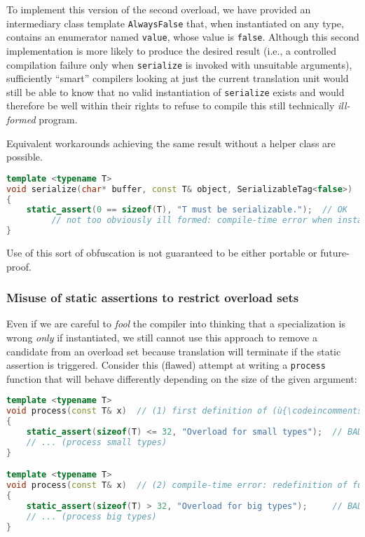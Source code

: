 \noindent To implement this version of the second overload, we have provided an
intermediary class template \lstinline!AlwaysFalse! that, when instantiated
on any type, contains an enumerator named \lstinline!value!, whose value is
\lstinline!false!. Although this second implementation is more likely to
produce the desired result (i.e., a controlled compilation failure
only when \lstinline!serialize! is invoked with unsuitable arguments),
sufficiently ``smart'' compilers looking at just the current translation
unit would still be able to know that no valid instantiation of
\lstinline!serialize! exists and would therefore be well within their
rights to refuse to compile this still technically \emph{ill-formed}
program.

Equivalent workarounds achieving the same result without a
helper class are possible.

\begin{lstlisting}[language=C++]
template <typename T>
void serialize(char* buffer, const T& object, SerializableTag<false>)  // (2c)
{
    static_assert(0 == sizeof(T), "T must be serializable.");  // OK
         // not too obviously ill formed: compile-time error when instantiated
}
\end{lstlisting}

\noindent Use of this sort of obfuscation is not guaranteed to be either
portable or future-proof.

\subsubsection[Misuse of static assertions to restrict overload sets]{Misuse of static assertions to restrict overload sets}\label{misuse-of-static-assertions-to-restrict-overload-sets}

Even if we are careful to \emph{fool} the compiler into thinking that a
specialization is wrong \emph{only} if instantiated, we still cannot use
this approach to remove a candidate from an overload set because translation
will terminate if the static assertion is triggered. Consider this
(flawed) attempt at writing a \lstinline!process! function that will behave
differently depending on the size of the given argument:

\begin{lstlisting}[language=C++]
template <typename T>
void process(const T& x)  // (1) first definition of (ù{\codeincomments{process}}ù) function
{
    static_assert(sizeof(T) <= 32, "Overload for small types");  // BAD IDEA
    // ... (process small types)
}

template <typename T>
void process(const T& x)  // (2) compile-time error: redefinition of function
{
    static_assert(sizeof(T) > 32, "Overload for big types");     // BAD IDEA
    // ... (process big types)
}
\end{lstlisting}

